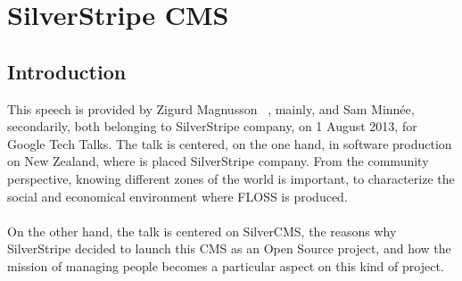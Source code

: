 \documentclass[11pt]{article}
\begin{document}
\pagebreak

\section{SilverStripe CMS}
\label{sec:silverstripe}
\subsection{Introduction}
This speech is provided by Zigurd Magnusson ~\cite{TALK02}, mainly, and Sam Minnée, secondarily, both belonging to SilverStripe company, on 1 August 2013, for Google Tech Talks. The talk is centered, on the one hand, in software production on New Zealand, where is placed SilverStripe company. From the community perspective, knowing different zones of the world is important, to characterize the social and economical environment where FLOSS is produced.\\
\\
On the other hand, the talk is centered on SilverCMS, the reasons why SilverStripe decided to launch this CMS as an Open Source project, and how the mission of managing people becomes a particular aspect on this kind of project.
\end{document}

